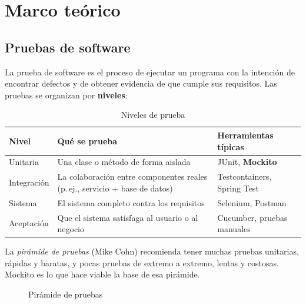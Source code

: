 \documentclass[11pt,a4paper,oneside]{report}
\begin{document}
\chapter{Marco teórico}

\section{Pruebas de software}
La prueba de software es el proceso de ejecutar un programa con la intención de encontrar defectos y de obtener evidencia de que cumple sus requisitos. Las pruebas se organizan por \textbf{niveles}:

\begin{table}[H]
\centering
\caption{Niveles de prueba}
\begin{tabularx}{\linewidth}{lXl}
\toprule
\textbf{Nivel} & \textbf{Qué se prueba} & \textbf{Herramientas típicas}\\
\midrule
Unitaria & Una clase o método de forma aislada & JUnit, \textbf{Mockito}\\
Integración & La colaboración entre componentes reales (p.\,ej., servicio + base de datos) & Testcontainers, Spring Test\\
Sistema & El sistema completo contra los requisitos & Selenium, Postman\\
Aceptación & Que el sistema satisfaga al usuario o al negocio & Cucumber, pruebas manuales\\
\bottomrule
\end{tabularx}
\end{table}

La \emph{pirámide de pruebas} (Mike Cohn) recomienda tener muchas pruebas unitarias, rápidas y baratas, y pocas pruebas de extremo a extremo, lentas y costosas. Mockito es lo que hace viable la base de esa pirámide.

\begin{figure}[H]
\centering
{}
\caption{Pirámide de pruebas}
\end{figure}
\end{document}
